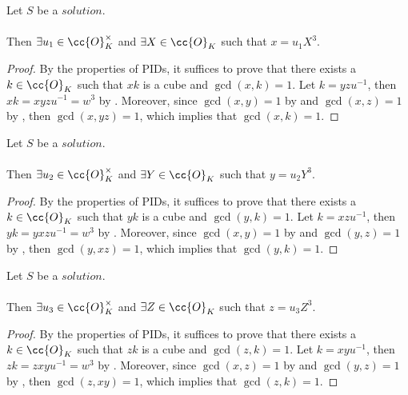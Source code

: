 \begin{lemma}
  \label{lmm:x_eq_unit_mul_cube}
  \leanok
  Let $S$ be a $solution$.\\\\
  Then $\exists u_1 \in \cc{O}^\times_K$ and $\exists X \in \cc{O}_K$
  such that $x = u_1 X^3$.
\end{lemma}
\begin{proof}
  \leanok
  By the properties of PIDs, it suffices to prove that there exists a $k\in \cc{O}_K$ such that
  $xk$ is a cube and $\gcd(x,k)=1$.
  Let $k = yzu^{-1}$, then $xk = x y z u^{-1} = w^3$ by .
  Moreover, since $\gcd(x,y)=1$ by  and $\gcd(x,z)=1$ by ,
  then $\gcd(x,yz)=1$, which implies that $\gcd(x,k)=1$.
\end{proof}

\begin{lemma}
  \label{lmm:y_eq_unit_mul_cube}
  \leanok
  Let $S$ be a $solution$.\\\\
  Then $\exists u_2 \in \cc{O}^\times_K$ and $\exists Y \in \cc{O}_K$
  such that $y = u_2 Y^3$.
\end{lemma}
\begin{proof}
  \leanok
  By the properties of PIDs, it suffices to prove that there exists a $k\in \cc{O}_K$ such that
  $yk$ is a cube and $\gcd(y,k)=1$.
  Let $k = xzu^{-1}$, then $yk = y x z u^{-1} = w^3$ by .
  Moreover, since $\gcd(x,y)=1$ by  and $\gcd(y,z)=1$ by ,
  then $\gcd(y,xz)=1$, which implies that $\gcd(y,k)=1$.
\end{proof}

\begin{lemma}
  \label{lmm:z_eq_unit_mul_cube}
  \leanok
  Let $S$ be a $solution$.\\\\
  Then $\exists u_3 \in \cc{O}^\times_K$ and $\exists Z \in \cc{O}_K$
  such that $z = u_3  Z^3$.
\end{lemma}
\begin{proof}
  \leanok
  By the properties of PIDs, it suffices to prove that there exists a $k\in \cc{O}_K$ such that
  $zk$ is a cube and $\gcd(z,k)=1$.
  Let $k = xyu^{-1}$, then $zk = z x y u^{-1} = w^3$ by .
  Moreover, since $\gcd(x,z)=1$ by  and $\gcd(y,z)=1$ by ,
  then $\gcd(z,xy)=1$, which implies that $\gcd(z,k)=1$.
\end{proof}

